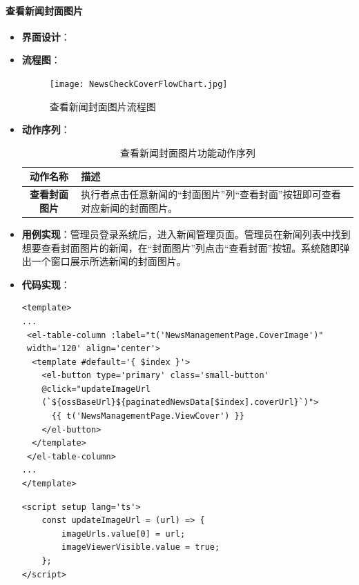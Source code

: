 \paragraph{查看新闻封面图片}
\begin{itemize}
	\item \textbf{界面设计}：
	\item \textbf{流程图}：
	\begin{figure}[H]
		\centering
		\texttt{[image: NewsCheckCoverFlowChart.jpg]}
		\caption{查看新闻封面图片流程图}
		\label{NewsCheckCoverFlowChart}
	\end{figure}
	\item \textbf{动作序列}：
	\begin{table}[H]
		\centering
		\caption{查看新闻封面图片功能动作序列}
		\renewcommand\arraystretch{1.5}
		\begin{tabular}{|c|>{\raggedright\arraybackslash}p{10cm}|}
			\hline
			\textbf{动作名称} & \textbf{描述} \\ \hline
			\textbf{查看封面图片} & 执行者点击任意新闻的“封面图片”列“查看封面”按钮即可查看对应新闻的封面图片。 \\ \hline
		\end{tabular}
	\end{table}
	\item \textbf{用例实现}：管理员登录系统后，进入新闻管理页面。管理员在新闻列表中找到想要查看封面图片的新闻，在“封面图片”列点击“查看封面”按钮。系统随即弹出一个窗口展示所选新闻的封面图片。
	\item \textbf{代码实现}：
	\begin{verbatim}
<template>
...
 <el-table-column :label="t('NewsManagementPage.CoverImage')" 
 width='120' align='center'>
  <template #default='{ $index }'>
    <el-button type='primary' class='small-button' 
    @click="updateImageUrl
    (`${ossBaseUrl}${paginatedNewsData[$index].coverUrl}`)">
      {{ t('NewsManagementPage.ViewCover') }}
    </el-button>
  </template>
 </el-table-column>
...
</template>
	\end{verbatim}
	
	\begin{verbatim}
<script setup lang='ts'>
	const updateImageUrl = (url) => {
		imageUrls.value[0] = url;
		imageViewerVisible.value = true;
	};
</script>
	\end{verbatim}
\end{itemize}


